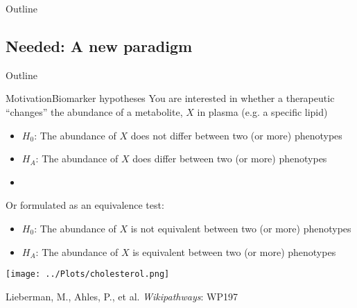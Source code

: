 \documentclass[xcolor=dvipsnames]{beamer}
\begin{document}
\begin{frame}{Outline}
\vspace{-10.5pt}
\tableofcontents[currentsection,subsectionstyle=show/show/hide]
\addtocounter{framenumber}{-1}
\end{frame}

\subsection{Needed: A new paradigm}
\begin{frame}{Outline}
\vspace{-10.5pt}
\tableofcontents[currentsection,subsectionstyle=show/shaded/hide]
\addtocounter{framenumber}{-1}
\end{frame}

\begin{frame}{Motivation}{Biomarker hypotheses}
	\vspace{-10pt}
	You are interested in whether a therapeutic ``changes'' the abundance of a metabolite, $X$ in plasma (e.g. a specific lipid) \pause
	\begin{itemize}
		\item $H_0$: The abundance of $X$ does not differ between two (or more) phenotypes \pause
		\item $H_A$: The abundance of $X$ does differ between two (or more) phenotypes 
		\item[]
	\end{itemize} \pause
	
	Or formulated as an equivalence test:
	\begin{itemize}
		\item $H_0$: The abundance of $X$ is not equivalent between two (or more) phenotypes  
		\item $H_A$: The abundance of $X$ is equivalent between two (or more) phenotypes  
	\end{itemize}
\end{frame}

\begin{frame}
	\begin{center}
			\texttt{[image: ../Plots/cholesterol.png]}
			
			Lieberman, M., Ahles, P., et al. \emph{Wikipathways}: WP197
	\end{center}
\end{frame}
\end{document}
